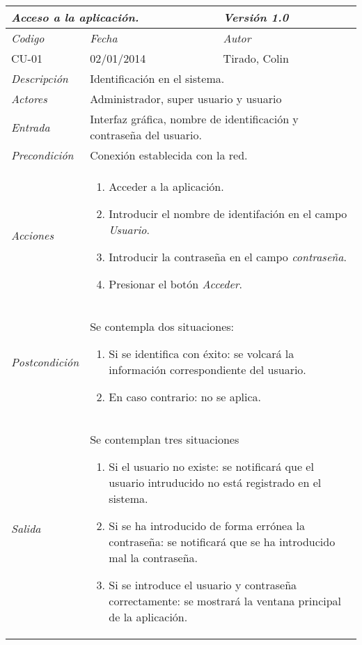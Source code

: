 \begin{center}
    \begin{tabular}{|p{3cm}|p{4cm}|p{4cm}|p{4cm}|}
        \hline \multicolumn{3}{|p{9cm}|}{\textit{Acceso a la aplicaci\'on.}} & \textit{Versi\'on 1.0} \\
        \hline \textit{Codigo} & \textit{Fecha} & \multicolumn{2}{|p{6cm}|}{\textit{Autor}} \\
        CU-01 & 02/01/2014 & \multicolumn{2}{|p{6cm}|}{Tirado, Colin} \\
        \hline \textit{Descripci\'on} & \multicolumn{3}{|p{9cm}|}{Identificaci\'on en el sistema.} \\
        \hline \textit{Actores} & \multicolumn{3}{|p{9cm}|}{Administrador, super usuario y usuario} \\
        \hline \textit{Entrada} & \multicolumn{3}{|p{9cm}|}{Interfaz gr\'afica, nombre de identificaci\'on y contrase\~na del usuario.} \\
        \hline \textit{Precondici\'on} & \multicolumn{3}{|p{9cm}|}{Conexi\'on establecida con la red.} \\
        \hline \textit{Acciones} & \multicolumn{3}{|p{9cm}|}{
        \begin{enumerate}
            \item Acceder a la aplicaci\'on.
            \item Introducir el nombre de identifaci\'on en el campo \textit{Usuario}.
            \item Introducir la contrase\~na en el campo \textit{contrase\~na}.
            \item Presionar el bot\'on \textit{Acceder}.
        \end{enumerate}
        } \\
        \hline \textit{Postcondici\'on} & \multicolumn{3}{|p{9cm}|}{Se contempla dos situaciones:
        \begin{enumerate}
            \item Si se identifica con \'exito: se volcar\'a la informaci\'on correspondiente del usuario.
            \item En caso contrario: no se aplica.
        \end{enumerate}
        } \\
        \hline \textit{Salida} & \multicolumn{3}{|p{9cm}|}{Se contemplan tres situaciones
        \begin{enumerate}
            \item Si el usuario no existe: se notificar\'a que el usuario intruducido no est\'a registrado en el sistema.
            \item Si se ha introducido de forma err\'onea la contrase\~na: se notificar\'a que se ha introducido mal la contrase\~na.
            \item Si se introduce el usuario y contrase\~na correctamente: se mostrar\'a la ventana principal de la aplicaci\'on.
        \end{enumerate} } \\ \hline
    \end{tabular}
\end{center}
